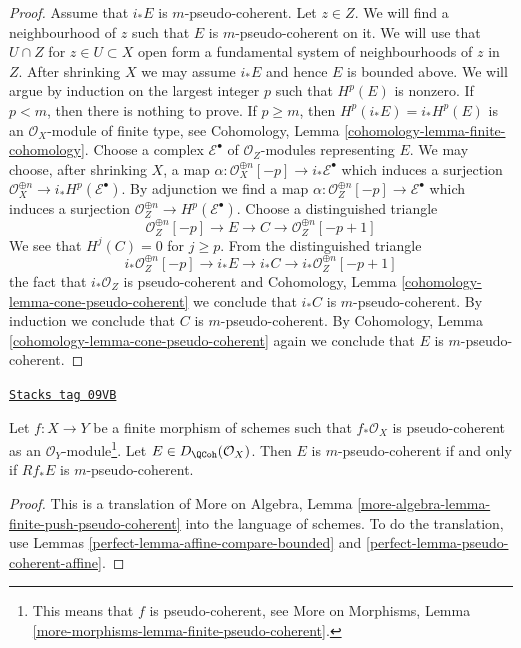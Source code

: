 \begin{proof}
\medskip\noindent
Assume that $i_*E$ is $m$-pseudo-coherent. Let $z \in Z$.
We will find a neighbourhood of $z$ such that $E$
is $m$-pseudo-coherent on it. We will use
that $U \cap Z$ for $z \in U \subset X$ open form a fundamental system of
neighbourhoods of $z$ in $Z$. After shrinking $X$ we may assume $i_*E$
and hence $E$ is bounded above. We will argue by induction on
the largest integer $p$ such that $H^p(E)$ is nonzero. If $p < m$, then
there is nothing to prove. If $p \geq m$, then $H^p(i_*E) = i_*H^p(E)$
is an $\mathcal{O}_X$-module of finite type, see
Cohomology, Lemma \ref{cohomology-lemma-finite-cohomology}.
Choose a complex $\mathcal{E}^\bullet$ of $\mathcal{O}_Z$-modules
representing $E$. We may choose, after shrinking $X$,
a map $\alpha : \mathcal{O}_X^{\oplus n}[-p] \to i_*\mathcal{E}^\bullet$
which induces a surjection
$\mathcal{O}_X^{\oplus n} \to i_*H^p(\mathcal{E}^\bullet)$.
By adjunction we find a map
$\alpha : \mathcal{O}_Z^{\oplus n}[-p] \to \mathcal{E}^\bullet$
which induces a surjection
$\mathcal{O}_Z^{\oplus n} \to H^p(\mathcal{E}^\bullet)$.
Choose a distinguished triangle
$$
\mathcal{O}_Z^{\oplus n}[-p] \to E \to C \to \mathcal{O}_Z^{\oplus n}[-p + 1]
$$
We see that $H^j(C) = 0$ for $j \geq p$. From the distinguished triangle
$$
i_*\mathcal{O}_Z^{\oplus n}[-p] \to i_*E \to i_*C \to
i_*\mathcal{O}_Z^{\oplus n}[-p + 1]
$$
the fact that $i_*\mathcal{O}_Z$ is pseudo-coherent
and
Cohomology, Lemma \ref{cohomology-lemma-cone-pseudo-coherent}
we conclude that $i_*C$ is $m$-pseudo-coherent.
By induction we conclude that $C$ is $m$-pseudo-coherent.
By Cohomology, Lemma \ref{cohomology-lemma-cone-pseudo-coherent}
again we conclude that $E$ is $m$-pseudo-coherent.
\end{proof}

\begin{lemma}
\label{perfect-lemma-finite-push-pseudo-coherent}
\href{https://stacks.math.columbia.edu/tag/09VB}{\texttt{Stacks tag 09VB}}

Let $f : X \to Y$ be a finite morphism of schemes such that
$f_*\mathcal{O}_X$ is pseudo-coherent as an
$\mathcal{O}_Y$-module\footnote{This means that $f$ is pseudo-coherent, see
More on Morphisms, Lemma
\ref{more-morphisms-lemma-finite-pseudo-coherent}.}.
Let $E \in D_\QCoh(\mathcal{O}_X)$. Then $E$ is $m$-pseudo-coherent
if and only if $Rf_*E$ is $m$-pseudo-coherent.
\end{lemma}

\begin{proof}

This is a translation of
More on Algebra, Lemma \ref{more-algebra-lemma-finite-push-pseudo-coherent}
into the language of schemes. To do the translation, use
Lemmas \ref{perfect-lemma-affine-compare-bounded} and
\ref{perfect-lemma-pseudo-coherent-affine}.
\end{proof}

